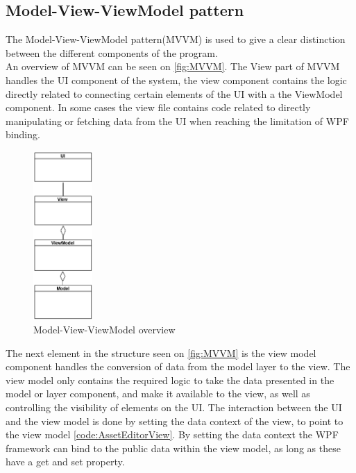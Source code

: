 \subsection{Model-View-ViewModel pattern} \label{sc:MVCVM}
The Model-View-ViewModel pattern(MVVM) is used to give a clear distinction between the different components of the program. \\
An overview of MVVM can be seen on \autoref{fig:MVVM}.
The View part of MVVM handles the UI component of the system, the view component contains the logic directly related to connecting certain elements of the UI with a the ViewModel component. In some cases the view file contains code related to directly manipulating or fetching data from the UI when reaching the limitation of WPF binding.

\begin{figure}[H]
    \centering
    \includegraphics[width=0.2\textwidth]{figures/Implementation/MVVM.PNG}
    \caption{Model-View-ViewModel overview}
    \label{fig:MVVM}
\end{figure}

The next element in the structure seen on \autoref{fig:MVVM} is the view model component handles the conversion of data from the model layer to the view. The view model only contains the required logic to take the data presented in the model or layer component, and make it available to the view, as well as controlling the visibility of elements on the UI. The interaction between the UI and the view model is done by setting the data context of the view, to point to the view model \autoref{code:AssetEditorView}. By setting the data context the WPF framework can bind to the public data within the view model, as long as these have a get and set property.

\vspace{\baselineskip}

